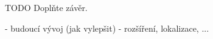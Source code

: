 \begin{conclusion}
    TODO Doplňte závěr.

    - budoucí vývoj (jak vylepšit)
    - rozšíření, lokalizace, ...
\end{conclusion}

